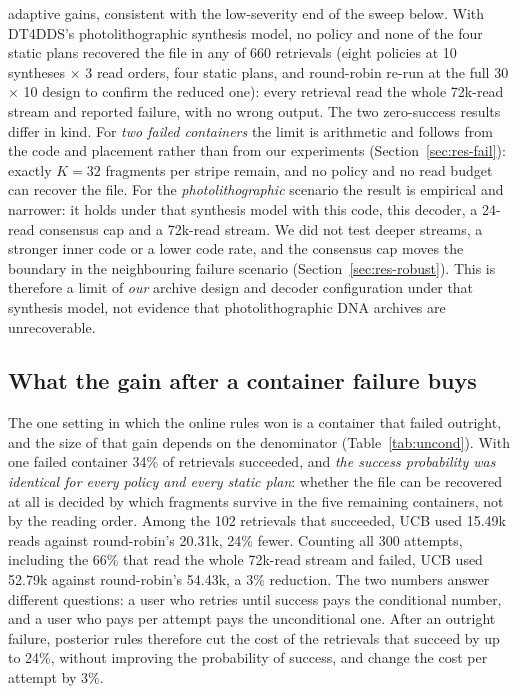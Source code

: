 \documentclass[conference,onecolumn,11pt]{IEEEtran}
\begin{document}
adaptive gains, consistent with the low-severity end of the sweep below.  With DT4DDS's photolithographic
synthesis model, no policy and none of the four static plans recovered the file in any of 660 retrievals
(eight policies at 10 syntheses $\times$ 3 read orders, four static plans, and round-robin re-run at the
full 30 $\times$ 10 design to confirm the reduced one): every retrieval read the whole 72k-read stream and reported failure,
with no wrong output.  The two zero-success results differ in kind.  For \emph{two failed containers}
the limit is arithmetic and follows from the code and placement rather than from our experiments
(Section~\ref{sec:res-fail}): exactly $K{=}32$ fragments per stripe remain, and no policy and no read
budget can recover the file.  For the \emph{photolithographic} scenario the result is empirical and
narrower: it holds under that synthesis model with this code, this decoder, a 24-read consensus cap and
a 72k-read stream.  We did not test deeper streams, a stronger inner code or a lower code rate, and the
consensus cap moves the boundary in the neighbouring failure scenario (Section~\ref{sec:res-robust}).
This is therefore a limit of \emph{our} archive design and decoder configuration under that synthesis
model, not evidence that photolithographic DNA archives are unrecoverable.

\subsection{What the gain after a container failure buys}\label{sec:res-uncond}

The one setting in which the online rules won is a container that failed outright, and the size of that
gain depends on the denominator (Table~\ref{tab:uncond}).  With one failed container 34\% of retrievals
succeeded, and \emph{the success probability was identical for every policy and every static plan}:
whether the file can be recovered at all is decided by which fragments survive in the five remaining
containers, not by the reading order.  Among the 102 retrievals that succeeded, UCB used 15.49k reads
against round-robin's 20.31k, 24\% fewer.  Counting all 300 attempts, including the 66\% that read the
whole 72k-read stream and failed, UCB used 52.79k against round-robin's 54.43k, a 3\% reduction.  The
two numbers answer different questions: a user who retries until success pays the conditional number,
and a user who pays per attempt pays the unconditional one.  After an outright failure, posterior rules
therefore cut the cost of the retrievals that succeed by up to 24\%, without improving the probability
of success, and change the cost per attempt by 3\%.
\end{document}
